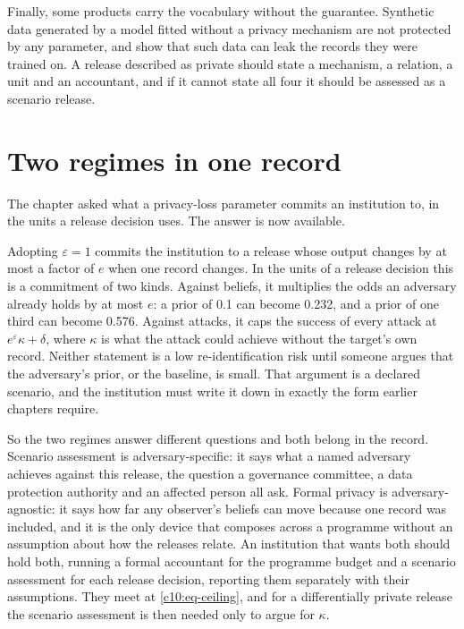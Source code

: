 Finally, some products carry the vocabulary without the guarantee. Synthetic data
generated by a model fitted without a privacy mechanism are not protected by any
parameter, and \citet{stadler2022} show that such data can leak the records they
were trained on. A release described as private should state a mechanism, a
relation, a unit and an accountant, and if it cannot state all four it should be
assessed as a scenario release.

\section{Two regimes in one record}

The chapter asked what a privacy-loss parameter commits an institution to, in the
units a release decision uses. The answer is now available.

Adopting $\varepsilon = 1$ commits the institution to a release whose output
changes by at most a factor of $e$ when one record changes. In the units of a
release decision this is a commitment of two kinds. Against beliefs, it multiplies
the odds an adversary already holds by at most $e$: a prior of 0.1 can become
0.232, and a prior of one third can become 0.576. Against attacks, it caps the
success of every attack at $e^\varepsilon\kappa + \delta$, where $\kappa$ is what
the attack could achieve without the target's own record. Neither statement is a
low re-identification risk until someone argues that the adversary's prior, or the
baseline, is small. That argument is a declared scenario, and the institution must
write it down in exactly the form earlier chapters require.

So the two regimes answer different questions and both belong in the record.
Scenario assessment is adversary-specific: it says what a named adversary achieves
against this release, the question a governance committee, a data protection
authority and an affected person all ask. Formal privacy is adversary-agnostic: it
says how far any observer's beliefs can move because one record was included, and
it is the only device that composes across a programme without an assumption about
how the releases relate. An institution that wants both should hold both, running
a formal accountant for the programme budget and a scenario assessment for each
release decision, reporting them separately with their assumptions. They meet at
\eqref{c10:eq-ceiling}, and for a differentially private release the scenario
assessment is then needed only to argue for $\kappa$.


